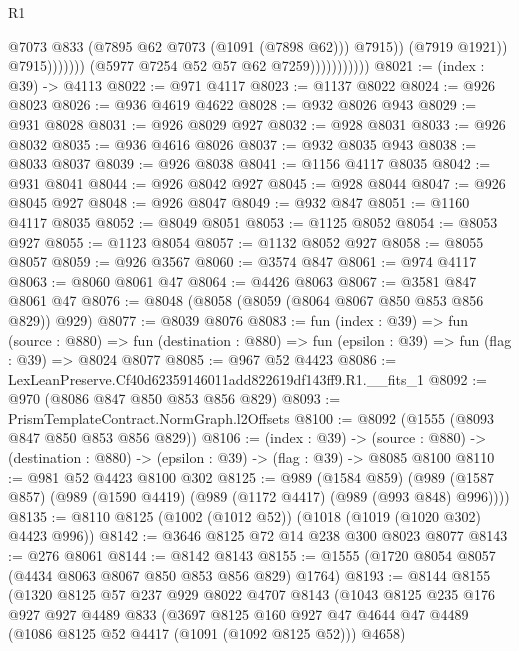 \begin{lexlean}{R1}
\begin{coremodule}
                                            @7073
                                            @833
                                            (@7895 @62 @7073 (@1091 (@7898 @62)))
                                            @7915))
                                        (@7919 @1921))
                                      @7915)))))))
                        (@5977 @7254 @52 @57 @62 @7259)))))))))))
@8021 := (index : @39) -> @4113
@8022 := @971 @4117
@8023 := @1137 @8022
@8024 := @926 @8023
@8026 := @936 @4619 @4622
@8028 := @932 @8026 @943
@8029 := @931 @8028
@8031 := @926 @8029 @927
@8032 := @928 @8031
@8033 := @926 @8032
@8035 := @936 @4616 @8026
@8037 := @932 @8035 @943
@8038 := @8033 @8037
@8039 := @926 @8038
@8041 := @1156 @4117 @8035
@8042 := @931 @8041
@8044 := @926 @8042 @927
@8045 := @928 @8044
@8047 := @926 @8045 @927
@8048 := @926 @8047
@8049 := @932 @847
@8051 := @1160 @4117 @8035
@8052 := @8049 @8051
@8053 := @1125 @8052
@8054 := @8053 @927
@8055 := @1123 @8054
@8057 := @1132 @8052 @927
@8058 := @8055 @8057
@8059 := @926 @3567
@8060 := @3574 @847
@8061 := @974 @4117
@8063 := @8060 @8061 @47
@8064 := @4426 @8063
@8067 := @3581 @847 @8061 @47
@8076 := @8048 (@8058 (@8059 (@8064 @8067 @850 @853 @856 @829)) @929)
@8077 := @8039 @8076
@8083 := fun (index : @39) =>
  fun (source : @880) =>
  fun (destination : @880) => fun (epsilon : @39) => fun (flag : @39) => @8024 @8077
@8085 := @967 @52 @4423
@8086 := LexLeanPreserve.Cf40d62359146011add822619df143ff9.R1.__fits_1
@8092 := @970 (@8086 @847 @850 @853 @856 @829)
@8093 := PrismTemplateContract.NormGraph.l2Offsets
@8100 := @8092 (@1555 (@8093 @847 @850 @853 @856 @829))
@8106 := (index : @39) ->
  (source : @880) -> (destination : @880) -> (epsilon : @39) -> (flag : @39) -> @8085 @8100
@8110 := @981 @52 @4423 @8100 @302
@8125 := @989
    (@1584 @859)
    (@989 (@1587 @857) (@989 (@1590 @4419) (@989 (@1172 @4417) (@989 (@993 @848) @996))))
@8135 := @8110 @8125 (@1002 (@1012 @52)) (@1018 (@1019 (@1020 @302) @4423 @996))
@8142 := @3646 @8125 @72 @14 @238 @300 @8023 @8077
@8143 := @276 @8061
@8144 := @8142 @8143
@8155 := @1555 (@1720 @8054 @8057 (@4434 @8063 @8067 @850 @853 @856 @829) @1764)
@8193 := @8144
    @8155
    (@1320
      @8125
      @57
      @237
      @929
      @8022
      @4707
      @8143
      (@1043
        @8125
        @235
        @176
        @927
        @927
        @4489
        @833
        (@3697
          @8125
          @160
          @927
          @47
          @4644
          @47
          @4489
          (@1086 @8125 @52 @4417 (@1091 (@1092 @8125 @52)))
          @4658)

\end{coremodule}
\end{lexlean}
